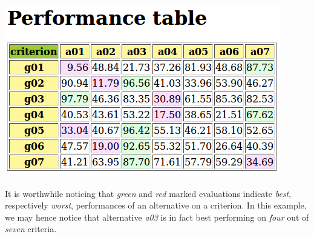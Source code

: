 \documentclass[letterpaper,10pt,english]{sphinxmanual}
\begin{document}
{\hfill\includegraphics{tutorialPerfTab.png}\hfill}

It is worthwhile noticing that \emph{green} and \emph{red} marked evaluations indicate \emph{best}, respectively \emph{worst}, performances of an alternative on a criterion. In this example, we may hence notice that alternative \emph{a03} is in fact best performing on \emph{four} out of \emph{seven} criteria.
\end{document}
